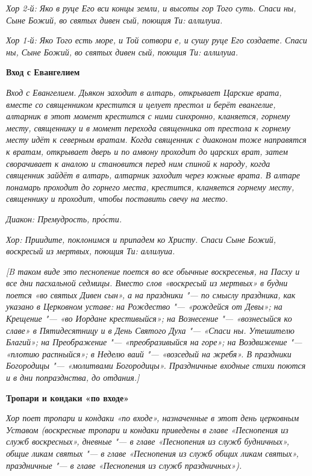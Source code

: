 \itshape Хор 2-й:\normalfont{} Яко в руце Его вси концы земли, и высоты гор Того суть. Спаси ны, Сыне Божий, во святых дивен сый, поющия Ти: аллилуиа.


\itshape Хор 1-й:\normalfont{} Яко Того есть море, и Той сотвори е, и сушу руце Его создаете. Спаси ны, Сыне Божий, во святых дивен сый, поющия Ти: аллилуиа.





\bfseries Вход с Евангелием\normalfont{}


\itshape Вход с Евангелием. Дьякон заходит в алтарь, открывает Царские врата, вместе со священником крестится и целует престол и берёт евангелие, алтарник в этот момент крестится с ними синхронно, кланяется, горнему месту, священнику и в момент перехода священника от престола к горнему месту идёт к северным вратам. Когда священник с диаконом тоже направятся к вратам, открывает дверь и по амвону проходит до царских врат, затем сворачивает к аналою и становится перед ним спиной к народу, когда священник зайдёт в алтарь, алтарник заходит через южные врата. В алтаре понамарь проходит до горнего места, крестится, кланяется горнему месту, священнику и проходит, чтобы поставить свечу на место.\normalfont{}


\itshape Диакон:\normalfont{} Премудрость, про́сти.


\itshape Хор:\normalfont{} Приидите, поклонимся и припадем ко Христу. Спаси Сыне Божий, воскресый из мертвых, поющия Ти: аллилуиа.


\itshape [B таком виде это песнопение поется во все обычные воскресенья, на Пасху и все дни пасхальной седмицы. Вместо слов «воскресый из мертвых» в будни поется «во святых Дивен сын», а на праздники "--- по смыслу праздника, как указано в Церковном уставе: на Рождество "--- «рождейся от Девы»; на Крещение "--- «во Иордане крестивыйся»; на Вознесение "--- «вознесыйся ко славе» в Пятидесятницу и в День Святого Духа "--- «Спаси ны. Утешителю Благий»; на Преображение "--- «преобразивыйся на горе»; на Воздвижение "--- «плотию распныйся»; в Неделю ваий "--- «возседый на жребя». В праздники Богородицы "--- «молитвами Богородицы». Праздничные входные стихи поются и в дни попразднства, до отдания.]\normalfont{}





\bfseries Тропари и кондаки «по входе»\normalfont{}


\itshape Хор поет тропари и кондаки «по входе», назначенные в этот день церковным Уставом (воскресные тропари и кондаки приведены в главе «Песнопения из служб воскресных», дневные "--- в главе «Песнопения из служб будничных», общие ликам святых "--- в главе «Песнопения из служб общих ликам святых», праздничные "--- в главе «Песнопения из служб праздничных»).\normalfont{}


